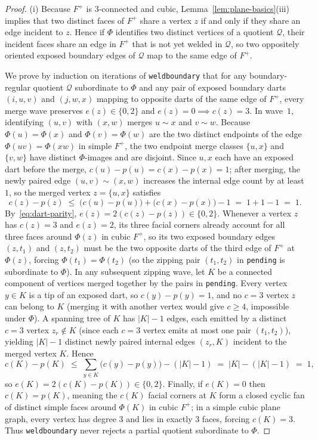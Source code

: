\documentclass[11pt,reqno]{amsart}
\theoremstyle{plain}
\theoremstyle{definition}
\theoremstyle{remark}
\DeclareRobustCommand{\_}{\ifmmode\text{\textunderscore}\else\textunderscore\allowbreak\fi}
\begin{document}
\begin{proof}
(i) Because $F^+$ is $3$-connected and cubic, Lemma~\ref{lem:plane-basics}(iii) implies that two distinct faces of $F^+$ share a vertex $z$ if and only if they share an edge incident to $z$. Hence if $\Phi$ identifies two distinct vertices of a quotient $\mathcal{Q}$, their incident faces share an edge in $F^+$ that is not yet welded in $\mathcal{Q}$, so two oppositely oriented exposed boundary edges of $\mathcal{Q}$ map to the same edge of $F^+$.

We prove by induction on iterations of \texttt{weld\_boundary} that for any boundary-regular quotient $\mathcal{Q}$ subordinate to $\Phi$ and any pair of exposed boundary darts $(i, u, v)$ and $(j, w, x)$ mapping to opposite darts of the same edge of $F^+$, every merge wave preserves $e(z) \in \{0, 2\}$ and $e(z) = 0 \implies c(z) = 3$. In wave~$1$, identifying $(u, v)$ with $(x, w)$ merges $u \sim x$ and $v \sim w$. Because $\Phi(u) = \Phi(x)$ and $\Phi(v) = \Phi(w)$ are the two distinct endpoints of the edge $\Phi(uv) = \Phi(xw)$ in simple $F^+$, the two endpoint merge classes $\{u, x\}$ and $\{v, w\}$ have distinct $\Phi$-images and are disjoint. Since $u, x$ each have an exposed dart before the merge, $c(u) - p(u) = c(x) - p(x) = 1$; after merging, the newly paired edge $(u, v) \sim (x, w)$ increases the internal edge count by at least $1$, so the merged vertex $z = \{u, x\}$ satisfies
\[
  c(z) - p(z) \;\le\; \bigl(c(u) - p(u)\bigr) + \bigl(c(x) - p(x)\bigr) - 1 \;=\; 1 + 1 - 1 \;=\; 1.
\]
By~\eqref{eq:dart-parity}, $e(z) = 2(c(z) - p(z)) \in \{0, 2\}$. Whenever a vertex $z$ has $c(z) = 3$ and $e(z) = 2$, its three facial corners already account for all three faces around $\Phi(z)$ in cubic $F^+$, so its two exposed boundary edges $(z, t_1)$ and $(z, t_2)$ must be the two opposite darts of the third edge of $F^+$ at $\Phi(z)$, forcing $\Phi(t_1) = \Phi(t_2)$ (so the zipping pair $(t_1, t_2)$ in \texttt{pending} is subordinate to $\Phi$). In any subsequent zipping wave, let $K$ be a connected component of vertices merged together by the pairs in \texttt{pending}. Every vertex $y \in K$ is a tip of an exposed dart, so $c(y) - p(y) = 1$, and no $c = 3$ vertex $z$ can belong to $K$ (merging it with another vertex would give $c \ge 4$, impossible under $\Phi$). A spanning tree of $K$ has $|K| - 1$ edges, each emitted by a distinct $c = 3$ vertex $z_r \notin K$ (since each $c = 3$ vertex emits at most one pair $(t_1, t_2)$), yielding $|K| - 1$ distinct newly paired internal edges $(z_r, K)$ incident to the merged vertex $K$. Hence
\[
  c(K) - p(K) \;\le\; \sum_{y \in K} \bigl(c(y) - p(y)\bigr) - (|K| - 1) \;=\; |K| - (|K| - 1) \;=\; 1,
\]
so $e(K) = 2(c(K) - p(K)) \in \{0, 2\}$. Finally, if $e(K) = 0$ then $c(K) = p(K)$, meaning the $c(K)$ facial corners at $K$ form a closed cyclic fan of distinct simple faces around $\Phi(K)$ in cubic $F^+$; in a simple cubic plane graph, every vertex has degree $3$ and lies in exactly $3$ faces, forcing $c(K) = 3$. Thus \texttt{weld\_boundary} never rejects a partial quotient subordinate to $\Phi$.


\end{proof}
\end{document}
